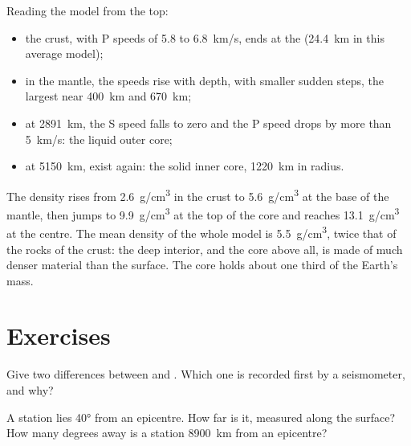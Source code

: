 Reading the model from the top:
\begin{itemize}
  \item the crust, with P speeds of 5.8 to \qty{6.8}{km/s}, ends at the 
        (\qty{24.4}{km} in this average model);
  \item in the mantle, the speeds rise with depth, with smaller sudden
        steps, the largest near \qty{400}{km} and \qty{670}{km};
  \item at \qty{2891}{km}, the S speed falls to zero and the P speed drops
        by more than \qty{5}{km/s}: the liquid outer core;
  \item at \qty{5150}{km},  exist again: the solid inner core,
        \qty{1220}{km} in radius.
\end{itemize}

The density rises from \qty{2.6}{g/cm^3} in the crust to
\qty{5.6}{g/cm^3} at the base of the mantle, then jumps to
\qty{9.9}{g/cm^3} at the top of the core and reaches \qty{13.1}{g/cm^3} at
the centre. The mean density of the whole model is \qty{5.5}{g/cm^3}, twice
that of the rocks of the crust: the deep interior, and the core above all, is
made of much denser material than the surface. The core holds about one
third of the Earth's mass.

\section{Exercises}

\begin{exercise}[$\star$]\label{exo:g11:seismic-structure:1}
Give two differences between  and . Which one is recorded first
by a seismometer, and why?
\end{exercise}

\begin{exercise}[$\star$]\label{exo:g11:seismic-structure:2}
A station lies \ang{40} from an epicentre. How far is it, measured along the
surface? How many degrees away is a station \qty{8900}{km} from an
epicentre?
\end{exercise}

